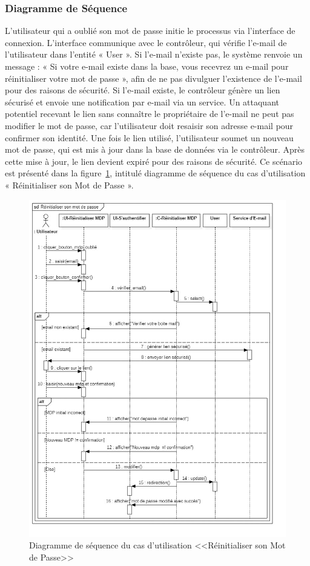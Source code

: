 \subsubsection{Diagramme de Séquence}
L’utilisateur qui a oublié son mot de passe initie le processus via l’interface de connexion. L’interface communique avec le contrôleur, qui vérifie l’e-mail de l’utilisateur dans l’entité « User ». Si l’e-mail n’existe pas, le système renvoie un message : « Si votre e-mail existe dans la base, vous recevrez un e-mail pour réinitialiser votre mot de passe », afin de ne pas divulguer l’existence de l’e-mail pour des raisons de sécurité. Si l’e-mail existe, le contrôleur génère un lien sécurisé et envoie une notification par e-mail via un service. Un attaquant potentiel recevant le lien sans connaître le propriétaire de l’e-mail ne peut pas modifier le mot de passe, car l’utilisateur doit resaisir son adresse e-mail pour confirmer son identité. Une fois le lien utilisé, l’utilisateur soumet un nouveau mot de passe, qui est mis à jour dans la base de données via le contrôleur. Après cette mise à jour, le lien devient expiré pour des raisons de sécurité. Ce scénario est présenté dans la figure~\ref{fig:seq_reset_password}, intitulé diagramme de séquence du cas d’utilisation « Réinitialiser son Mot de Passe ».
\begin{figure}[ht]
     \centering
     \includegraphics[width=17cm, height=0.9\textheight, keepaspectratio]{images/s_reset.jpg}
     \caption{Diagramme de séquence du cas d'utilisation <<Réinitialiser son Mot de Passe>>}
     \label{fig:seq_reset_password}
\end{figure}
\clearpage
